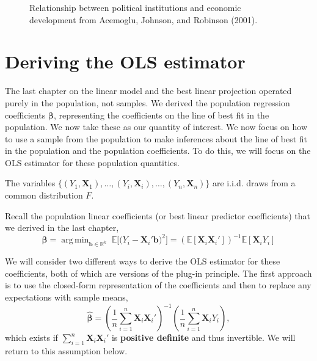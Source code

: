 \documentclass[
  13pt,
  letterpaper,
  DIV=11,
  numbers=noendperiod]{scrreprt}
\newcommand{\mb}{\symbf}
\newcommand{\E}{\mathbb{E}}
\newcommand{\real}{\mathbb{R}}
\newcommand{\X}{\mb{X}}
\newcommand{\bfbeta}{\mb{\beta}}
\newcommand{\bhat}{\widehat{\mb{\beta}}}
\DeclareMathOperator*{\argmin}{arg\,min}
\theoremstyle{plain}
\theoremstyle{definition}
\theoremstyle{definition}
\theoremstyle{remark}
\begin{document}
\begin{figure}[th]


\caption{\label{fig-ajr-scatter}Relationship between political
institutions and economic development from Acemoglu, Johnson, and
Robinson (2001).}

\end{figure}%

\section{Deriving the OLS estimator}\label{deriving-the-ols-estimator}

The last chapter on the linear model and the best linear projection
operated purely in the population, not samples. We derived the
population regression coefficients \(\bfbeta\), representing the
coefficients on the line of best fit in the population. We now take
these as our quantity of interest. We now focus on how to use a sample
from the population to make inferences about the line of best fit in the
population and the population coefficients. To do this, we will focus on
the OLS estimator for these population quantities.

\begin{tcolorbox}[enhanced jigsaw, title=\textcolor{quarto-callout-note-color}{\faInfo}\hspace{0.5em}{Assumption}, breakable, colbacktitle=quarto-callout-note-color!10!white, toptitle=1mm, colback=white, arc=.35mm, left=2mm, opacityback=0, titlerule=0mm, colframe=quarto-callout-note-color-frame, leftrule=.75mm, coltitle=black, opacitybacktitle=0.6, bottomtitle=1mm, rightrule=.15mm, bottomrule=.15mm, toprule=.15mm]

The variables
\(\{(Y_1, \X_1), \ldots, (Y_i,\X_i), \ldots, (Y_n, \X_n)\}\) are i.i.d.
draws from a common distribution \(F\).

\end{tcolorbox}

Recall the population linear coefficients (or best linear predictor
coefficients) that we derived in the last chapter, \[ 
\bfbeta = \argmin_{\mb{b} \in \real^k}\; \E\bigl[ \bigl(Y_{i} - \mb{X}_{i}'\mb{b} \bigr)^2\bigr] = \left(\E[\X_{i}\X_{i}']\right)^{-1}\E[\X_{i}Y_{i}]
\]

We will consider two different ways to derive the OLS estimator for
these coefficients, both of which are versions of the plug-in principle.
The first approach is to use the closed-form representation of the
coefficients and then to replace any expectations with sample means, \[ 
\bhat = \left(\frac{1}{n} \sum_{i=1}^n \X_i\X_i' \right)^{-1} \left(\frac{1}{n} \sum_{i=1}^n \X_{i}Y_{i} \right),
\] which exists if \(\sum_{i=1}^n \X_i\X_i'\) is \textbf{positive
definite} and thus invertible. We will return to this assumption below.
\end{document}

